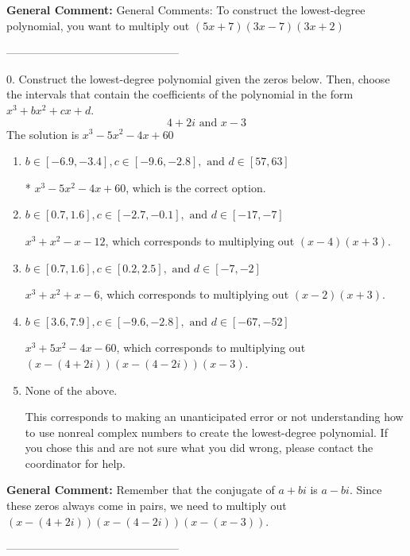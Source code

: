\documentclass{extbook}[14pt]
\begin{document}
\textbf{General Comment:} General Comments: To construct the lowest-degree polynomial, you want to multiply out $(5x + 7)(3x -7)(3x + 2)$ 

-----------------------------------------------

0. Construct the lowest-degree polynomial given the zeros below. Then, choose the intervals that contain the coefficients of the polynomial in the form $x^3+bx^2+cx+d$.
\[ 4 + 2 i \text{ and } x -3 \] 
The solution is $ x^{3} -5 x^{2} -4 x + 60 $ 

\begin{enumerate}[label=\Alph*.] 
\item $ b \in [-6.9, -3.4], c \in [-9.6, -2.8], \text{ and } d \in [57, 63] $ 

 * $x^{3} -5 x^{2} -4 x + 60$, which is the correct option. 
\item $ b \in [0.7, 1.6], c \in [-2.7, -0.1], \text{ and } d \in [-17, -7] $ 

 $x^{3} + x^{2} -x -12$, which corresponds to multiplying out $(x -4)(x + 3)$. 
\item $ b \in [0.7, 1.6], c \in [0.2, 2.5], \text{ and } d \in [-7, -2] $ 

 $x^{3} + x^{2} +x -6$, which corresponds to multiplying out $(x -2)(x + 3)$. 
\item $ b \in [3.6, 7.9], c \in [-9.6, -2.8], \text{ and } d \in [-67, -52] $ 

 $x^{3} +5 x^{2} -4 x -60$, which corresponds to multiplying out $(x-(4 + 2 i))(x-(4 - 2 i))(x -3)$. 
\item $ \text{None of the above.} $ 

 This corresponds to making an unanticipated error or not understanding how to use nonreal complex numbers to create the lowest-degree polynomial. If you chose this and are not sure what you did wrong, please contact the coordinator for help. 
\end{enumerate} 
 
\textbf{General Comment:} Remember that the conjugate of $a+bi$ is $a-bi$. Since these zeros always come in pairs, we need to multiply out $(x-(4 + 2 i))(x-(4 - 2 i))(x-(x -3))$. 

-----------------------------------------------
\end{document}
